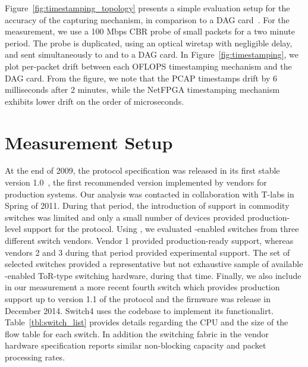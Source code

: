 Figure~\ref{fig:timestamping_topology} presents a simple evaluation setup for
the accuracy of the \oflops capturing mechanism, in comparison to a DAG
card~. For the measurement, we use a 100 Mbps CBR probe of
small packets for a two minute period. The probe is duplicated, using an optical
wiretap with negligible delay, and sent simultaneously to \oflops and to a DAG
card. In Figure~\ref{fig:timestamping}, we plot per-packet drift between each
OFLOPS timestamping mechanism and the DAG card. From the figure, we note that
the PCAP timestamps drift by 6 milliseconds after 2 minutes, while the NetFPGA
timestamping mechanism exhibits lower drift on the order of microseconds.




\section{Measurement Setup}\label{sec:oflops-switches}

At the end of 2009, the \of protocol specification was released in its first
stable version 1.0~, the first recommended version
implemented by vendors for production systems.  Our analysis was contacted in
collaboration with T-labs in Spring of 2011. During that period, the
introduction of \of support in commodity switches was limited and only a small
number of devices provided production-level support for the protocol.  Using
\oflops, we evaluated \of-enabled switches from three different switch vendors.
Vendor 1 provided production-ready \of support, whereas vendors 2 and 3 during
that period provided experimental \of support. The set of selected switches
provided a representative but not exhaustive sample of available \of-enabled
ToR-type switching hardware, during that time. Finally, we also include in our
measurement a more recent fourth \of switch which provides production support up
to version 1.1 of the \of protocol and the firmware was release in December
2014.  Switch4 uses the \ovs codebase to implement its \of functionalirt.
Table~\ref{tbl:switch_list} provides details regarding the CPU and the size of
the flow table for each switch. In addition the switching fabric in the vendor
hardware specification reports similar non-blocking capacity and packet
processing rates. 

